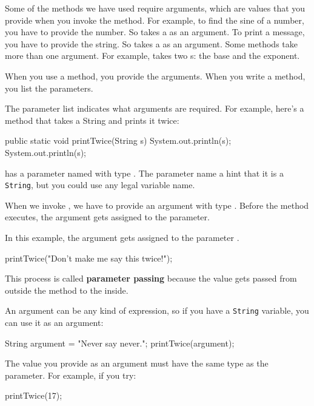 Some of the methods we have used require arguments, which are values that you provide when you invoke the method.
For example, to find the sine of a number, you have to provide the number.
So  takes a  as an argument.
To print a message, you have to provide the string.
So  takes a  as an argument.
Some methods take more than one argument.
For example,  takes two s: the base and the exponent.

When you use a method, you provide the arguments.
When you write a method, you list the parameters.

The parameter list indicates what arguments are required.
For example, here's a method that takes a String and prints it twice:

\begin{code}
    public static void printTwice(String s) {
        System.out.println(s);
        System.out.println(s);
    }
\end{code}

 has a parameter named  with type .
The parameter name a hint that it is a {\tt String}, but you could use any legal variable name.

When we invoke , we have to provide an argument with type .  Before the method executes, the argument gets assigned to the parameter.

In this example, the argument  gets assigned to the parameter .

\begin{code}
    printTwice("Don't make me say this twice!");
\end{code}


This process is called {\bf parameter passing} because the value gets passed from outside the method to the inside.

An argument can be any kind of expression, so if you have a {\tt String} variable, you can use it as an argument:

\begin{code}
    String argument = "Never say never.";
    printTwice(argument);
\end{code}

The value you provide as an argument must have the same type as the parameter.
For example, if you try:

\begin{code}
    printTwice(17);
\end{code}

